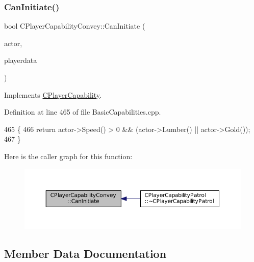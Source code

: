 \subsubsection{\texorpdfstring{Can\+Initiate()}{CanInitiate()}}
{\footnotesize\ttfamily bool C\+Player\+Capability\+Convey\+::\+Can\+Initiate (\begin{DoxyParamCaption}\item[{std\+::shared\+\_\+ptr$<$ \hyperlink{classCPlayerAsset}{C\+Player\+Asset} $>$}]{actor,  }\item[{std\+::shared\+\_\+ptr$<$ \hyperlink{classCPlayerData}{C\+Player\+Data} $>$}]{playerdata }\end{DoxyParamCaption})\hspace{0.3cm}{\ttfamily [virtual]}}



Implements \hyperlink{classCPlayerCapability_aa83b1e1fcaff2985c378132d679154ea}{C\+Player\+Capability}.



Definition at line 465 of file Basic\+Capabilities.\+cpp.


\begin{DoxyCode}
465                                                                                                            
                \{
466     \textcolor{keywordflow}{return} actor->Speed() > 0 && (actor->Lumber() || actor->Gold());
467 \}
\end{DoxyCode}
Here is the caller graph for this function\+:\nopagebreak
\begin{figure}[H]
\begin{center}
\leavevmode
\includegraphics[width=350pt]{classCPlayerCapabilityConvey_a6c5ebd62a9c3a619c56e070aca5443a7_icgraph}
\end{center}
\end{figure}


\subsection{Member Data Documentation}
\hypertarget{classCPlayerCapabilityConvey_ad04d0065f16c9cbef01832f5a071246d}{}\label{classCPlayerCapabilityConvey_ad04d0065f16c9cbef01832f5a071246d} 
